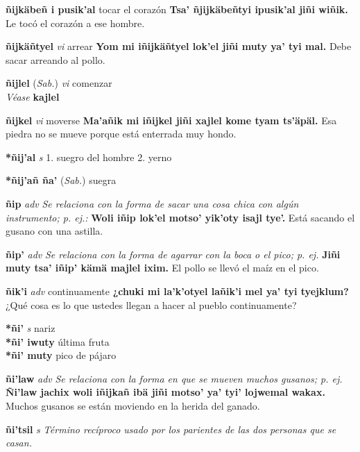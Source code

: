 \documentclass[10pt]{scrbook}
\newcommand{\entry}[1]{\textbf{#1}}
\newcommand{\onedefinition}[1]{#1.}
\newcommand{\nontranslationdef}[1]{\textit{#1}}
\newcommand{\partofspeech}[1]{\textit{#1}}
\newcommand{\spanishtranslation}[1]{#1}
\newcommand{\cholexample}[1]{\textbf{#1}}
\newcommand{\exampletranslation}[1]{#1}
\newcommand{\alsosee}[1]{\\\textit{Véase} \textbf{#1}}
\newcommand{\relevantdialect}[1]{(\textit{#1})}
\newcommand{\secondaryentry}[1]{\\\textbf{#1}}
\newcommand{\secondtranslation}[1]{#1}
\begin{document}
\begin{multicols}{2}
\entry{ñijkäbeñ i pusik'al}
\spanishtranslation{tocar el corazón}
\cholexample{Tsa' ñjijkäbeñtyi ipusik'al jiñi wiñik.}
\exampletranslation{Le tocó el corazón a ese hombre.}

\entry{ñijkäñtyel}
\partofspeech{vi}
\spanishtranslation{arrear}
\cholexample{Yom mi iñijkäñtyel lok'el jiñi muty ya' tyi mal.}
\exampletranslation{Debe sacar arreando al pollo.}

\entry{ñijlel}
\relevantdialect{Sab.}
\partofspeech{vi}
\spanishtranslation{comenzar}
\alsosee{kajlel}

\entry{ñijkel}
\partofspeech{vi}
\spanishtranslation{moverse}
\cholexample{Ma'añik mi iñijkel jiñi xajlel kome tyam ts'äpäl.}
\exampletranslation{Esa piedra no se mueve porque está enterrada muy hondo.}

\entry{*ñij'al}
\partofspeech{s}
\onedefinition{1}
\spanishtranslation{suegro del hombre}
\onedefinition{2}
\spanishtranslation{yerno}

\entry{*ñij'añ ña'}
\relevantdialect{Sab.}
\spanishtranslation{suegra}

\entry{ñip}
\partofspeech{adv}
\nontranslationdef{Se relaciona con la forma de sacar una cosa chica con algún instrumento; p. ej.:}
\cholexample{Woli iñip lok'el motso' yik'oty isajl tye'.}
\exampletranslation{Está sacando el gusano con una astilla.}

\entry{ñip'}
\partofspeech{adv}
\nontranslationdef{Se relaciona con la forma de agarrar con la boca o el pico; p. ej.}
\cholexample{Jiñi muty tsa' iñip' kämä majlel ixim.}
\exampletranslation{El pollo se llevó el maíz en el pico.}

\entry{ñik'i}
\partofspeech{adv}
\spanishtranslation{continuamente}
\cholexample{¿chuki mi la'k'otyel lañik'i mel ya' tyi tyejklum?}
\exampletranslation{¿Qué cosa es lo que ustedes llegan a hacer al pueblo continuamente?}

\entry{*ñi'}
\partofspeech{s}
\spanishtranslation{nariz}
\secondaryentry{*ñi' iwuty}
\secondtranslation{última fruta}
\secondaryentry{*ñi' muty}
\secondtranslation{pico de pájaro}

\entry{ñi'law}
\partofspeech{adv}
\nontranslationdef{Se relaciona con la forma en que se mueven muchos gusanos; p. ej.}
\cholexample{Ñi'law jachix woli iñijkañ ibä jiñi motso' ya' tyi' lojwemal wakax.}
\exampletranslation{Muchos gusanos se están moviendo en la herida del ganado.}

\entry{ñi'tsil}
\partofspeech{s}
\nontranslationdef{Término recíproco usado por los parientes de las dos personas que se casan.}


\end{multicols}
\end{document}
